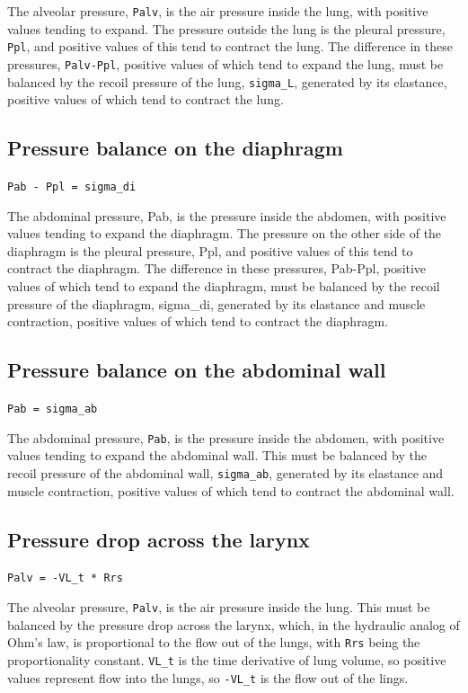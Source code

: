 \documentclass[12pt,openany,oneside]{book}
\newcommand{\ticode}[1]{\texttt{#1}}
\begin{document}
The alveolar pressure, \ticode{Palv}, is the air pressure inside the
lung, with positive values tending to expand.  The pressure outside
the lung is the pleural pressure, \ticode{Ppl}, and positive values of
this tend to contract the lung.  The difference in these pressures,
\ticode{Palv-Ppl}, positive values of which tend to expand the lung,
must be balanced by the recoil pressure of the lung, \ticode{sigma\_L},
generated by its elastance, positive values of which tend to contract
the lung.

\subsection{Pressure balance on the diaphragm}
\ticode{Pab - Ppl = sigma\_di}

The abdominal pressure, Pab, is the pressure inside the abdomen, with
positive values tending to expand the diaphragm.  The pressure on the
other side of the diaphragm is the pleural pressure, Ppl, and positive
values of this tend to contract the diaphragm.  The difference in
these pressures, Pab-Ppl, positive values of which tend to expand the
diaphragm, must be balanced by the recoil pressure of the diaphragm,
sigma\_di, generated by its elastance and muscle contraction, positive
values of which tend to contract the diaphragm.

\subsection{Pressure balance on the abdominal wall}
\ticode{Pab = sigma\_ab}

The abdominal pressure, \ticode{Pab}, is the pressure inside the
abdomen, with positive values tending to expand the abdominal wall.
This must be balanced by the recoil pressure of the abdominal wall,
\ticode{sigma\_ab}, generated by its elastance and muscle contraction,
positive values of which tend to contract the abdominal wall.

\subsection{Pressure drop across the larynx}
\ticode{Palv = -VL\_t * Rrs}

The alveolar pressure, \ticode{Palv}, is the air pressure inside the
lung.  This must be balanced by the pressure drop across the larynx,
which, in the hydraulic analog of Ohm's law, is proportional to the
flow out of the lungs, with \ticode{Rrs} being the proportionality
constant.  \ticode{VL\_t} is the time derivative of lung volume, so
positive values represent flow into the lungs, so \ticode{-VL\_t} is
the flow out of the lings.
\end{document}
